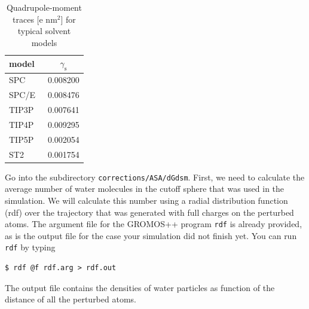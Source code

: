 \begin{table}[h]
  \center
  \caption{ Quadrupole-moment traces [e nm$^2$] for typical solvent models}
  \label{tab:quadrupole_moments}
  \begin{tabular}{ l  c  }
    \hline
    \textbf{model} & $\gamma_{\text{s}}$ \\ 
    \hline
    SPC~\cite{Berendsen1981} & 0.008200 \\
    SPC/E~\cite{Berendsen1987} & 0.008476 \\
    TIP3P~\cite{Jorgensen1983} & 0.007641 \\
    TIP4P~\cite{Jorgensen1983} & 0.009295 \\
    TIP5P~\cite{Mahoney2000} & 0.002054 \\
    ST2~\cite{Stillinger1974} & 0.001754 \\
    \hline
  \end{tabular}
\end{table}
%
Go into the subdirectory \texttt{corrections/ASA/dGdsm}. First, we need
to calculate the average number of water molecules in the cutoff
sphere that was used in the simulation. We will calculate this number
using a radial distribution function (rdf) over the trajectory that
was generated with full charges on the perturbed atoms. The argument
file for the GROMOS++ program \texttt{rdf} is already provided, 
as is the output file for the case your simulation did not finish yet.
You can run \texttt{rdf} by typing
\begin{lstlisting}
$ rdf @f rdf.arg > rdf.out 
\end{lstlisting}
The output file contains the densities of water particles as function of
the distance of all the perturbed atoms. 
